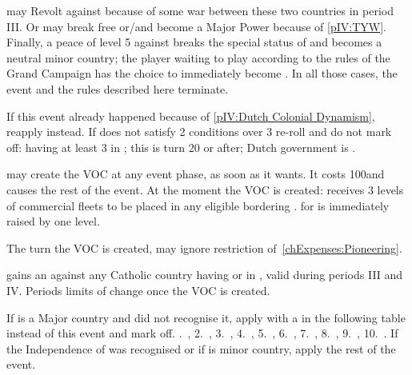 \effetlong
\aparag \paysHollande may Revolt against \SPA because of some war between
these two countries in period III.
\aparag Or \paysHollande may break free or/and become a Major Power because of
\ref{pIV:TYW}.
\aparag Finally, a peace of level 5 against \SPA breaks the special status of
\VASSAL and \paysHollande becomes a neutral minor country; the player waiting
to play \HOL according to the rules of the Grand Campaign has the choice to
immediately become \HOL.
\aparag In all those cases, the event and the rules described here terminate.





\condition{}
\aparag If this event already happened because of \ref{pIV:Dutch Colonial
  Dynamism}, reapply  instead.
\aparag If \HOL does not satisfy 2 conditions over 3 re-roll and do not mark
off: having at least 3 \TP in ; this is turn 20 or after;
Dutch government is .

\phevnt
\aparag \HOL may create the VOC at any event phase, as soon as it wants. It
costs 100\ducats and causes the rest of the event.
\aparag At the moment the VOC is created:
\bparag \HOL receives 3 levels of commercial fleets to be placed in any
eligible \STZ bordering .
\bparag \FTI for \HOL is immediately raised by one level.


\phadm
\aparag The turn the VOC is created, \HOL may ignore restriction
of~\ref{chExpenses:Pioneering}.

\effetlong
\aparag \HOL gains an \OCB against any Catholic country having \TP or \COL in
, valid during periods III and IV.
\aparag Periods limits of \HOL change once the VOC is created.




\condition{}
\aparag If \HOL is a Major country and \SPA did not recognise it, apply \RD
with a \REVOLT in the following table instead of this event and mark off.
.~\provinceZeeland, 2.~\provinceHolland, 3.~\provinceUtrecht,
4.~\provinceLimburg, 5.~\provinceLiege, 6.~\provinceLuxemburg,
7.~\provinceHainaut, 8.~\provinceFlandre, 9.~\provinceVlaanderen,
10.~\provinceBrabant.
\aparag If the Independence of \HOL was recognised or if \paysHollande is
minor country, apply the rest of the event.

